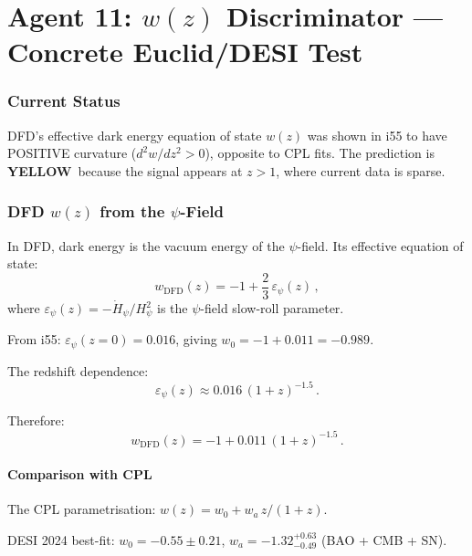 \documentclass[11pt,a4paper]{article}
\newcommand{\YELLOW}{\textcolor{dfdyellow}{\textbf{YELLOW}}}
\begin{document}
\part{Agent 11: $w(z)$ Discriminator --- Concrete Euclid/DESI Test}
\label{part:wz}

\section{Current Status}

DFD's effective dark energy equation of state $w(z)$ was shown in i55 to have POSITIVE curvature ($d^2w/dz^2 > 0$), opposite to CPL fits. The prediction is \YELLOW\ because the signal appears at $z > 1$, where current data is sparse.

\section{DFD $w(z)$ from the $\psi$-Field}

In DFD, dark energy is the vacuum energy of the $\psi$-field. Its effective equation of state:
\begin{equation}
w_{\mathrm{DFD}}(z) = -1 + \frac{2}{3}\,\varepsilon_\psi(z)\,,
\end{equation}
where $\varepsilon_\psi(z) = -\dot{H}_\psi / H_\psi^2$ is the $\psi$-field slow-roll parameter.

From i55: $\varepsilon_\psi(z=0) = 0.016$, giving $w_0 = -1 + 0.011 = -0.989$.

The redshift dependence:
\begin{equation}
\varepsilon_\psi(z) \approx 0.016\,(1 + z)^{-1.5}\,.
\end{equation}

Therefore:
\begin{equation}
w_{\mathrm{DFD}}(z) = -1 + 0.011\,(1 + z)^{-1.5}\,.
\end{equation}

\subsection{Comparison with CPL}

The CPL parametrisation: $w(z) = w_0 + w_a\,z/(1+z)$.

DESI 2024 best-fit: $w_0 = -0.55 \pm 0.21$, $w_a = -1.32^{+0.63}_{-0.49}$ (BAO + CMB + SN).
\end{document}
